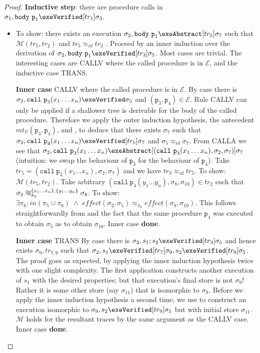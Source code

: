 \documentclass[runningheads,a4paper]{llncs}
\DeclareMathOperator{\band}{\bm{\;\land\;}}
\DeclareMathOperator{\suchthat}{:}
\newcommand*{\qvars}[2]{#1_{#2}}
\newcommand*{\identity}[0]{\mathit{id}}
\newcommand{\tr}{tr}
\newcommand*\iso{\approx}
\newcommand*{\equivmap}{\mathcal{E}}
\newcommand*{\muttermname}{\mathit{mt}}
\newcommand*{\mutterm}[3]{{\muttermname}_{#1}(#2,#3)}
\newcommand*\Vsemantics{\mathcal{V}}
\newcommand*{\callRuleAbstract}{\textnormal{CALLA}}
\newcommand*{\callRuleConcrete}{\textnormal{CALLV}}
\newcommand*{\callRuleVerified}{\callRuleConcrete{}}
\newcommand*{\blTrans}{TRANS}
\newcommand{\diff}{\mathit{effect}}
\newcommand*{\call}{\mathtt{call}}
\newcommand*{\body}{\mathtt{body}}
\newcommand*{\fun}{\texttt{p}}
\newcommand*{\bijection}[1]{\mathit{in}{\left(#1\right)}}
\newcommand*{\wiso}{%
  \mathrel{\vcenter{\offinterlineskip
  \hbox{$\sim$}\vskip-.35ex\hbox{$\sim$}\vskip-.35ex\hbox{$\sim$}}}}
\newcommand*{\mutR}{\mathcal{M}}
\newcommand*{\store}{\sigma}
\begin{document}
\begin{proof}
\noindent\textbf{Inductive step}: there are procedure calls in $\store_1,\body~\fun_1\exeVerified[\tr_1]\store_3$.
\begin{itemize}
\item[] To show: there exists an execution $\store_2,\body~\fun_1\exeAbstract[\tr_5]\store_7$ such that $\mutR(\tr_5,\tr_2)$ and $\tr_5\iso_\identity\tr_3$ \tagsix{}.
%
Proceed by an inner induction over the derivation of $\store_2,\body~\fun_1\exeVerified[\tr_3]\store_5$.
%
Most cases are trivial. The interesting cases are \callRuleVerified{} where the called procedure is in $\equivmap$, and the inductive case \blTrans{}.

\noindent\textbf{Inner case} \callRuleVerified{} where the called procedure is in $\equivmap$.
%
By case there is $\store_2,\call~\fun_3(x_1 \ldots x_n) \exeVerified\store_5$ and $(\fun_3,\fun_4) \in \equivmap$.
%
Rule \callRuleVerified{} can only be applied if a shallower tree is derivable for the body of the called procedure. Therefore we apply the outer induction hypothesis, the antecedent $\mutterm{\Vsemantics}{\fun_3}{\fun_4}$, and , to deduce that there exists $\store_7$ such that $\store_2,\call~\fun_4(x_1 \ldots x_n) \exeVerified[\tr_5]\store_7$ and $\store_5\iso_{\identity}\store_7$. From \callRuleAbstract{} we see that $\store_2,\call~\fun_3(x_1 \ldots x_n) \exeAbstract[(\call~\fun_3(x_1 \ldots x_n),\store_2,\store_7)]\store_7$ (intuition: we swap the behaviour of $\fun_3$ for the behaviour of $\fun_4$). Take $\tr_5=(\call~\fun_3(x_1 \ldots x_n),\store_2,\store_7)$ and we have $\tr_3\iso_{\identity}\tr_5$.
%
To show: $\mutR(\tr_5,\tr_2)$. Take arbitrary $(\call~\fun_4(y_1 \ldots y_n),\store_8,\store_{10}) \in \tr_2$ such that
$\store_2 \wiso_{\pi_5}^{\{x_1 \ldots x_n\},\{y_1 \ldots y_n\}} \store_8$. To show: $\exists \pi_6 \suchthat \bijection{\pi_5 \cup \pi_6} \band \diff(\store_2,\store_5) \iso_{\pi_6} \diff(\store_8,\store_{10})$. This follows straightforwardly from  and the fact that the same procedure $\fun_4$ was executed to obtain $\store_5$ as to obtain $\store_{10}$. Inner case \textbf{done}.

\noindent\textbf{Inner case} \blTrans{}
%
By case there is $\store_2,s_1;s_2 \exeVerified[\tr_3]\store_5$ and hence exists $\store_9,\qvars{\tr}{7,9}$ such that $\store_2,s_1 \exeVerified[\tr_7]\store_9,s_2 \exeVerified[\tr_9]\store_5$. The proof goes as expected, by applying the inner induction hypothesis twice with one slight complexity. The first application constructs another execution of $s_1$ with the desired properties; but that execution's final store is not $\store_9$! Rather it is some other store (say $\store_{11}$) that is isomorphic to $\store_9$. Before we apply the inner induction hypothesis a second time, we use  to construct an execution isomorphic to $\store_9,s_2 \exeVerified[\tr_9]\store_5$ but with initial store $\store_{11}$. $\mutR$ holds for the resultant traces by the same argument as the \callRuleVerified{} case. Inner case \textbf{done}.


\end{itemize}
\end{proof}
\end{document}
